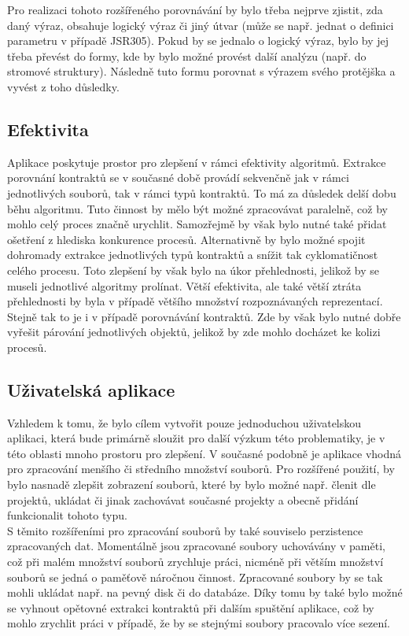 			Pro realizaci tohoto rozšířeného porovnávání by bylo třeba nejprve zjistit, zda daný výraz, obsahuje logický výraz či jiný útvar (může se např. jednat o definici parametru v případě JSR305). Pokud by se jednalo o logický výraz, bylo by jej třeba převést do formy, kde by bylo možné provést další analýzu (např. do stromové struktury). Následně tuto formu porovnat s výrazem svého protějška a vyvést z toho důsledky.
  		
  		\subsection{Efektivita}
	  		Aplikace poskytuje prostor pro zlepšení v rámci efektivity algoritmů. Extrakce porovnání kontraktů se v současné době provádí sekvenčně jak v rámci jednotlivých souborů, tak v rámci typů kontraktů. To má za důsledek delší dobu běhu algoritmu. Tuto činnost by mělo být možné zpracovávat paralelně, což by mohlo celý proces značně urychlit. Samozřejmě by však bylo nutné také přidat ošetření z hlediska konkurence procesů. Alternativně by bylo možné spojit dohromady extrakce jednotlivých typů kontraktů a snížit tak cyklomatičnost celého procesu. Toto zlepšení by však bylo na úkor přehlednosti, jelikož by se museli jednotlivé algoritmy prolínat. Větší efektivita, ale také větší ztráta přehlednosti by byla v případě většího množství rozpoznávaných reprezentací.\\
	  		
	  		Stejně tak to je i v případě porovnávání kontraktů. Zde by však bylo nutné dobře vyřešit párování jednotlivých objektů, jelikož by zde mohlo docházet ke kolizi procesů.
  		
  		\subsection{Uživatelská aplikace}
  			Vzhledem k tomu, že bylo cílem vytvořit pouze jednoduchou uživatelskou aplikaci, která bude primárně sloužit pro další výzkum této problematiky, je v této oblasti mnoho prostoru pro zlepšení. V současné podobně je aplikace vhodná pro zpracování menšího či středního množství souborů. Pro rozšířené použití, by bylo nasnadě zlepšit zobrazení souborů, které by bylo možné např. členit dle projektů, ukládat či jinak zachovávat současné projekty a obecně přidání funkcionalit tohoto typu.\\ 
  			
  			S těmito rozšířeními pro zpracování souborů by také souviselo perzistence zpracovaných dat. Momentálně jsou zpracované soubory uchovávány v paměti, což při malém množství souborů zrychluje práci, nicméně při větším množství souborů se jedná o paměťově náročnou činnost. Zpracované soubory by se tak mohli ukládat např. na pevný disk či do databáze. Díky tomu by také bylo možné se vyhnout opětovné extrakci kontraktů při dalším spuštění aplikace, což by mohlo zrychlit práci v případě, že by se stejnými soubory pracovalo více sezení.\\
  			
